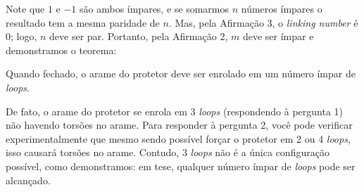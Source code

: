 	\par\vspace{0.3cm} Note que $1$ e $-1$ são ambos ímpares, e se somarmos $n$ números ímpares o resultado 
	tem a mesma paridade de $n$. Mas, pela Afirmação 3, o \textit{linking number} é $0$; logo, $n$ deve ser par.
	Portanto, pela Afirmação 2, $m$ deve ser ímpar e demonstramos o teorema:
	\begin{theorem}
	\label{teorema protetor de para-brisa}
		Quando fechado, o arame do protetor deve ser enrolado em um número ímpar de \textit{loops}.
	\end{theorem}  
	De fato, o arame do protetor se enrola em 3 \textit{loops} (respondendo à pergunta 1) 
	não havendo torsões no arame. Para responder à pergunta 2, você pode verificar experimentalmente que 
	mesmo sendo possível forçar o protetor em 2 ou 4 \textit{loops}, isso causará torsões no arame. Contudo, 
	$3$ \textit{loops} não é a única configuração possível, como demonstramos: em tese, qualquer número 
	ímpar de \textit{loops} pode ser alcançado.

